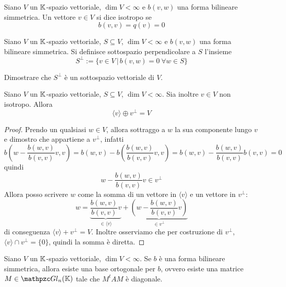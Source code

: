\documentclass{article}     %
\begin{document}
\begin{boxdef}
    Siano $V$ un $\mathbb{K}$-spazio vettoriale, $\dim V<\infty$ e $b(v,w)$ una forma bilineare simmetrica. Un vettore $v\in V$ si dice isotropo se 
    \[b(v,v)=q(v)=0\]
\end{boxdef}

\begin{boxdef}
    Siano $V$ un $\mathbb{K}$-spazio vettoriale, $S\subseteq V$, $\dim V<\infty$ e $b(v,w)$ una forma bilineare simmetrica. Si definisce sottospazio perpendicolare a $S$ l'insieme 
    \[S^\perp:=\{v\in V\,|\,b(v,w)=0\ \forall w \in S\}\]
\end{boxdef}
\begin{exc}\label{exc: sottosp perp}
    Dimostrare che $S^\perp$ è un sottospazio vettoriale di $V$.
\end{exc}
\begin{lemma}
    Siano $V$ un $\mathbb{K}$-spazio vettoriale, $S\subseteq V$, $\dim V<\infty$. Sia inoltre $v\in V$ non isotropo. Allora \[\langle v \rangle \oplus v^\perp = V\]
\end{lemma}
\begin{proof}
    Prendo un qualsiasi $w\in V$, allora sottraggo a $w$ la sua componente lungo $v$ e dimostro che appartiene a $v^\perp$, infatti 
    \[b\left( w-\frac{b(w,v)}{b(v,v)}v,v \right)= b(w,v)-b\left(\frac{b(w,v)}{b(v,v)}v,v\right)= b(w,v)-\frac{b(w,v)}{b(v,v)}b(v,v)=0\]
    quindi 
    \[ w-\frac{b(w,v)}{b(v,v)}v\in v^\perp\]
    Allora posso scrivere $w$ come la somma di un vettore in $\langle v\rangle$ e un vettore in $v^\perp$:
    \[w=\underbrace{\frac{b(w,v)}{b(v,v)}v}_{\in\langle v\rangle}+\underbrace{\left( w-\frac{b(w,v)}{b(v,v)}v \right)}_{\in v^\perp}\]
    di conseguenza \(\langle v \rangle + v^\perp = V\). Inoltre osserviamo che per costruzione di $v^\perp$, \(\langle v \rangle \cap v^\perp = \{0\}\), quindi la somma è diretta.
\end{proof}

\begin{shadedTheorem}
    Siano $V$ un $\mathbb{K}$-spazio vettoriale, $\dim V<\infty$. Se $b$ è una forma bilineare simmetrica, allora esiste una base ortogonale per $b$, ovvero esiste una matrice $M\in \gln{n}{\K}$ tale che $M^tAM$ è diagonale.
\end{shadedTheorem}
\end{document}
